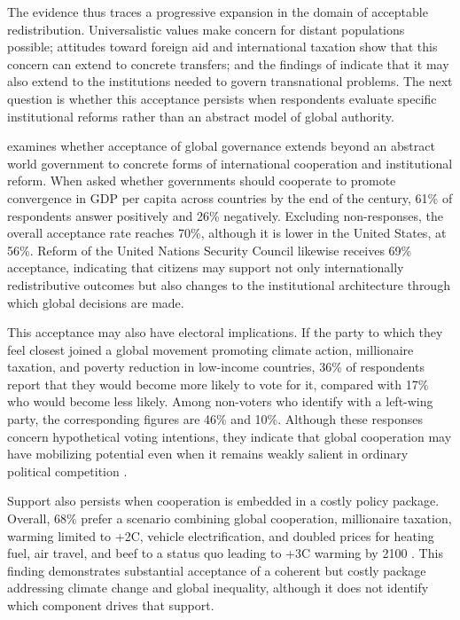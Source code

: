 The evidence thus traces a progressive expansion in the domain of acceptable redistribution. Universalistic values make concern for distant populations possible; attitudes toward foreign aid and international taxation show that this concern can extend to concrete transfers; and the findings of \citet{ghassim_who_2024} indicate that it may also extend to the institutions needed to govern transnational problems. The next question is whether this acceptance persists when respondents evaluate specific institutional reforms rather than an abstract model of global authority.

\citet{fabre_public_2026} examines whether acceptance of global governance extends beyond an abstract world government to concrete forms of international cooperation and institutional reform. When asked whether governments should cooperate to promote convergence in GDP per capita across countries by the end of the century, 61\% of respondents answer positively and 26\% negatively. Excluding non-responses, the overall acceptance rate reaches 70\%, although it is lower in the United States, at 56\%. Reform of the United Nations Security Council %
likewise receives 69\% acceptance, indicating that citizens may support not only internationally redistributive outcomes but also changes to the institutional architecture through which global decisions are made.

This acceptance may also have electoral implications. If the party to which they feel closest joined a global movement promoting climate action, millionaire taxation, and poverty reduction in low-income countries, 36\% of respondents report that they would become more likely to vote for it, compared with 17\% who would become less likely. Among non-voters who identify with a left-wing party, the corresponding figures are 46\% and 10\%. Although these responses concern hypothetical voting intentions, they indicate that global cooperation may have mobilizing potential even when it remains weakly salient in ordinary political competition \citep{fabre_public_2026}.

Support also persists when cooperation is embedded in a costly policy package. Overall, 68\% prefer a scenario combining global cooperation, millionaire taxation, warming limited to +2\textdegree{}C, vehicle electrification, and doubled prices for heating fuel, air travel, and beef to a status quo leading to +3\textdegree{}C warming by 2100 \citep{fabre_public_2026}. This finding demonstrates substantial acceptance of a coherent but costly package addressing climate change and global inequality, although it does not identify which component drives that support.

